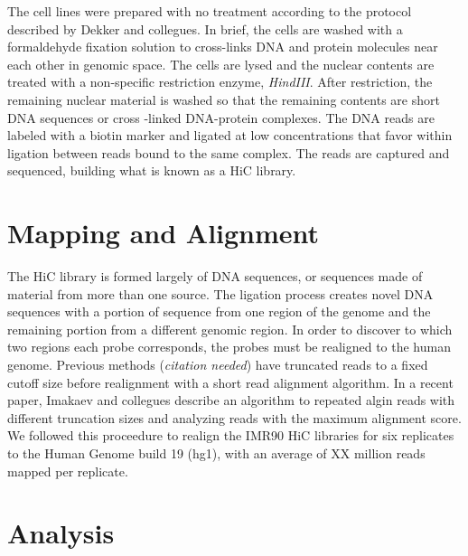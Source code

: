 \documentclass[phd,tocprelim]{cornell}
\begin{document}
The cell lines were prepared with no treatment according to the protocol
described by Dekker and collegues\cite{Dekker2013}.  In brief, the cells
are washed with a formaldehyde fixation solution to cross-links
DNA and protein molecules near each other in genomic space.  The cells are
lysed and the nuclear contents are treated with a non-specific restriction
enzyme, \textit{HindIII}.  After restriction, the remaining nuclear material
is washed so that the remaining contents are short DNA sequences or cross
-linked DNA-protein complexes.  The DNA reads are labeled with a biotin
marker and ligated at low concentrations that favor within ligation between
reads bound to the same complex.  The reads are captured and sequenced,
building what is known as a HiC library.





\section{Mapping and Alignment}

The HiC library is formed largely of  DNA sequences, or
sequences made of material from more than one source.  The ligation process
creates novel DNA sequences with a portion of sequence from one region of
the genome and the remaining portion from a different genomic region.  In
order to discover to which two regions each probe corresponds, the probes
must be realigned to the human genome.  Previous methods (\textit{citation needed})
have truncated reads to a fixed cutoff size before realignment with a short
read alignment algorithm.  In a recent paper, Imakaev and collegues
describe an algorithm to repeated algin reads with different truncation sizes
and analyzing reads with the maximum alignment score\cite{Imakaev2012}.  We followed
this proceedure to realign the IMR90 HiC libraries for six replicates to
the Human Genome build 19 (hg1), with an average of XX million reads
mapped per replicate.


\section{Analysis}

\end{document}
